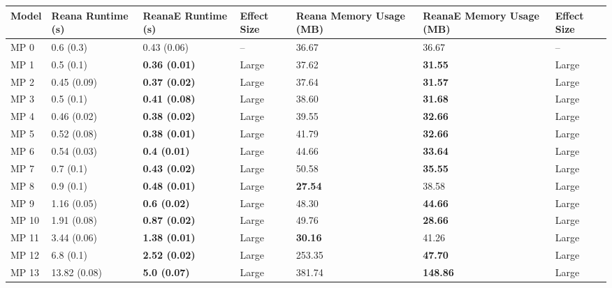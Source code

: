 \begin{tabular}{lllllll}
\toprule
 Model & Reana Runtime (s) &     ReanaE Runtime (s) & Effect Size & Reana Memory Usage (MB) & ReanaE Memory Usage (MB) & Effect Size \\
\midrule
  MP 0 &         0.6 (0.3) &            0.43 (0.06) &          -- &                   36.67 &                    36.67 &          -- \\
  MP 1 &         0.5 (0.1) &   \textbf{0.36 (0.01)} &       Large &                   37.62 &           \textbf{31.55} &       Large \\
  MP 2 &       0.45 (0.09) &   \textbf{0.37 (0.02)} &       Large &                   37.64 &           \textbf{31.57} &       Large \\
  MP 3 &         0.5 (0.1) &   \textbf{0.41 (0.08)} &       Large &                   38.60 &           \textbf{31.68} &       Large \\
  MP 4 &       0.46 (0.02) &   \textbf{0.38 (0.02)} &       Large &                   39.55 &           \textbf{32.66} &       Large \\
  MP 5 &       0.52 (0.08) &   \textbf{0.38 (0.01)} &       Large &                   41.79 &           \textbf{32.66} &       Large \\
  MP 6 &       0.54 (0.03) &    \textbf{0.4 (0.01)} &       Large &                   44.66 &           \textbf{33.64} &       Large \\
  MP 7 &         0.7 (0.1) &   \textbf{0.43 (0.02)} &       Large &                   50.58 &           \textbf{35.55} &       Large \\
  MP 8 &         0.9 (0.1) &   \textbf{0.48 (0.01)} &       Large &          \textbf{27.54} &                    38.58 &       Large \\
  MP 9 &       1.16 (0.05) &    \textbf{0.6 (0.02)} &       Large &                   48.30 &           \textbf{44.66} &       Large \\
 MP 10 &       1.91 (0.08) &   \textbf{0.87 (0.02)} &       Large &                   49.76 &           \textbf{28.66} &       Large \\
 MP 11 &       3.44 (0.06) &   \textbf{1.38 (0.01)} &       Large &          \textbf{30.16} &                    41.26 &       Large \\
 MP 12 &         6.8 (0.1) &   \textbf{2.52 (0.02)} &       Large &                  253.35 &           \textbf{47.70} &       Large \\
 MP 13 &      13.82 (0.08) &    \textbf{5.0 (0.07)} &       Large &                  381.74 &          \textbf{148.86} &       Large \\

\end{tabular}
